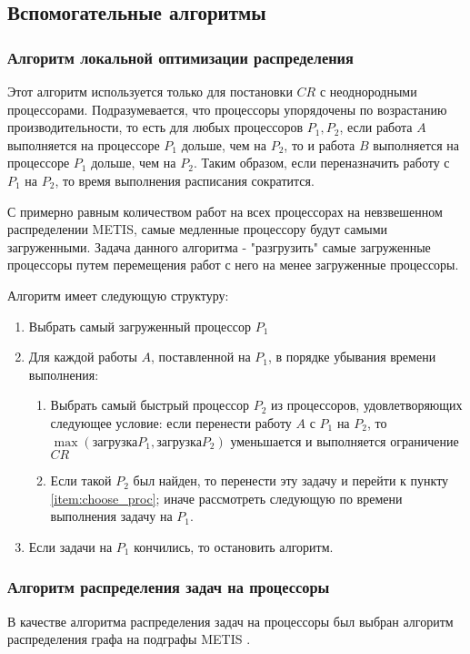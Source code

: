 \subsection{Вспомогательные алгоритмы}

\subsubsection{Алгоритм локальной оптимизации распределения} \label{partition_optimization}

Этот алгоритм используется только для постановки $CR$ с неоднородными процессорами. Подразумевается, что процессоры упорядочены по возрастанию производительности, то есть для любых процессоров $P_1, P_2$, если работа $A$ выполняется на процессоре $P_1$ дольше, чем на $P_2$, то и работа $B$ выполняется на процессоре $P_1$ дольше, чем на $P_2$. Таким образом, если переназначить работу с $P_1$ на $P_2$, то время выполнения расписания сократится.

С примерно равным количеством работ на всех процессорах на невзвешенном распределении METIS, самые медленные процессору будут самыми загруженными. Задача данного алгоритма - "разгрузить" самые загруженные процессоры путем перемещения работ с него на менее загруженные процессоры.

Алгоритм имеет следующую структуру:
\begin{enumerate}
    \item Выбрать самый загруженный процессор $P_1$
    \item Для каждой работы $A$, поставленной на $P_1$, в порядке убывания времени выполнения:
          \begin{enumerate}
              \item \label{item:choose_proc} Выбрать самый быстрый процессор $P_2$ из процессоров, удовлетворяющих следующее условие: если перенести работу $A$ с $P_1$ на $P_2$, то $\max(\text{загрузка} P_1, \text{загрузка} P_2)$ уменьшается и выполняется ограничение $CR$
              \item Если такой $P_2$ был найден, то перенести эту задачу и перейти к пункту \ref{item:choose_proc}; иначе рассмотреть следующую по времени выполнения задачу на $P_1$.
          \end{enumerate}
    \item Если задачи на $P_1$ кончились, то остановить алгоритм.
\end{enumerate}

\subsubsection{Алгоритм распределения задач на процессоры} \label{METIS}
В качестве алгоритма распределения задач на процессоры был выбран алгоритм распределения графа на подграфы METIS \cite{Karypis2011}.

